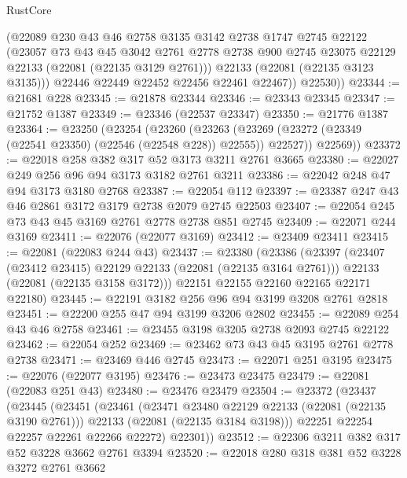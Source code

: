 \begin{lexlean}{RustCore}
\begin{coremodule}
            (@22089
              @230
              @43
              @46
              @2758
              @3135
              @3142
              @2738
              @1747
              @2745
              @22122
              (@23057
                @73
                @43
                @45
                @3042
                @2761
                @2778
                @2738
                @900
                @2745
                @23075
                @22129
                @22133
                (@22081 (@22135 @3129 @2761)))
              @22133
              (@22081 (@22135 @3123 @3135)))
            @22446
            @22449
            @22452
            @22456
            @22461
            @22467))
        @22530))
@23344 := @21681 @228
@23345 := @21878 @23344
@23346 := @23343 @23345
@23347 := @21752 @1387
@23349 := @23346 (@22537 @23347)
@23350 := @21776 @1387
@23364 := @23250
    (@23254
      (@23260
        (@23263 (@23269 (@23272 (@23349 (@22541 @23350) (@22546 (@22548 @228)) @22555)) @22527))
        @22569))
@23372 := @22018 @258 @382 @317 @52 @3173 @3211 @2761 @3665
@23380 := @22027 @249 @256 @96 @94 @3173 @3182 @2761 @3211
@23386 := @22042 @248 @47 @94 @3173 @3180 @2768
@23387 := @22054 @112
@23397 := @23387 @247 @43 @46 @2861 @3172 @3179 @2738 @2079 @2745 @22503
@23407 := @22054 @245 @73 @43 @45 @3169 @2761 @2778 @2738 @851 @2745
@23409 := @22071 @244 @3169
@23411 := @22076 (@22077 @3169)
@23412 := @23409 @23411
@23415 := @22081 (@22083 @244 @43)
@23437 := @23380
    (@23386
      (@23397
        (@23407 (@23412 @23415) @22129 @22133 (@22081 (@22135 @3164 @2761)))
        @22133
        (@22081 (@22135 @3158 @3172)))
      @22151
      @22155
      @22160
      @22165
      @22171
      @22180)
@23445 := @22191 @3182 @256 @96 @94 @3199 @3208 @2761 @2818
@23451 := @22200 @255 @47 @94 @3199 @3206 @2802
@23455 := @22089 @254 @43 @46 @2758
@23461 := @23455 @3198 @3205 @2738 @2093 @2745 @22122
@23462 := @22054 @252
@23469 := @23462 @73 @43 @45 @3195 @2761 @2778 @2738
@23471 := @23469 @446 @2745
@23473 := @22071 @251 @3195
@23475 := @22076 (@22077 @3195)
@23476 := @23473 @23475
@23479 := @22081 (@22083 @251 @43)
@23480 := @23476 @23479
@23504 := @23372
    (@23437
      (@23445
        (@23451
          (@23461
            (@23471 @23480 @22129 @22133 (@22081 (@22135 @3190 @2761)))
            @22133
            (@22081 (@22135 @3184 @3198)))
          @22251
          @22254
          @22257
          @22261
          @22266
          @22272)
        @22301))
@23512 := @22306 @3211 @382 @317 @52 @3228 @3662 @2761 @3394
@23520 := @22018 @280 @318 @381 @52 @3228 @3272 @2761 @3662

\end{coremodule}
\end{lexlean}
